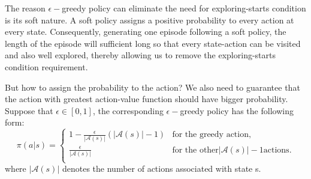     The reason $\epsilon-$greedy policy can eliminate the need for exploring-starts condition is its soft nature. A soft policy assigns a positive probability
    to every action at every state. Consequently, generating one episode following a soft policy, the length of the episode will sufficient long so that every
    state-action can be visited and also well explored, thereby allowing us to remove the exploring-starts condition requirement.

    But how to assign the probability to the action? We also need to guarantee that the action with greatest action-value function should have bigger
    probability. Suppose that $\epsilon \in[0,1]$, the corresponding $\epsilon-$greedy policy has the following form:
    \begin{equation*}
      \pi(a|s) = \begin{cases} 1-\frac{\epsilon}{\left|\mathcal{A}(s)\right|}\left(\left|\mathcal{A}(s)\right|-1\right) & \text{for the greedy action},                                      \\
              \frac{\epsilon}{\left|\mathcal{A}(s)\right|}                                             & \text{for the other} \left|\mathcal{A}(s)\right|-1 \text{actions}. \\\end{cases}
    \end{equation*}
    where $\left|\mathcal{A}(s)\right|$ denotes the number of actions associated with state s. \par

